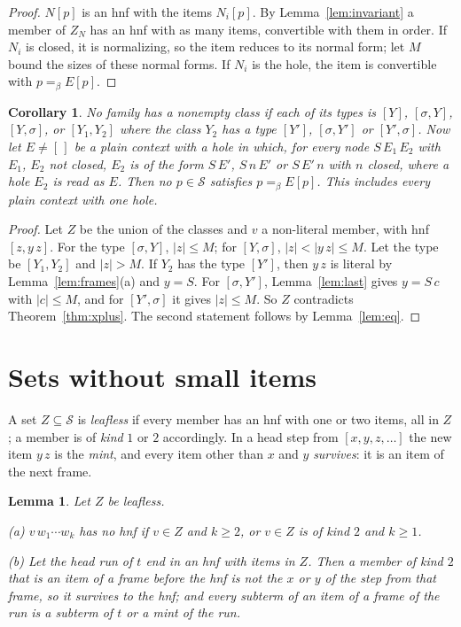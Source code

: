 \documentclass[11pt]{amsart}
\newtheorem{lemma}[theorem]{Lemma}
\newtheorem{corollary}[theorem]{Corollary}
\newcommand{\Ter}{\mathcal S}
\newcommand{\conv}{=_\beta}
\newcommand{\sz}[1]{\lvert#1\rvert}
\newcommand{\fr}[1]{[#1]}
\begin{document}
\begin{proof}
$N[p]$ is an hnf with the items $N_i[p]$. By Lemma~\ref{lem:invariant} a member of $Z_N$ has an hnf
with as many items, convertible with them in order. If $N_i$ is closed, it is normalizing, so the
item reduces to its normal form; let $M$ bound the sizes of these normal forms. If $N_i$ is the
hole, the item is convertible with $p\conv E[p]$.
\end{proof}

\begin{corollary}\label{cor:x1}
No family has a nonempty class if each of its types is $\fr{Y}$, $\fr{\sigma,Y}$, $\fr{Y,\sigma}$, or
$\fr{Y_1,Y_2}$ where the class $Y_2$ has a type $\fr{Y'}$, $\fr{\sigma,Y'}$ or $\fr{Y',\sigma}$.
Now let $E\ne[\,]$ be a plain context with a hole in which, for every node $S\,E_1\,E_2$ with
$E_1$, $E_2$ not closed, $E_2$ is of the form $S\,E'$, $S\,n\,E'$ or $S\,E'\,n$ with $n$ closed,
where a hole $E_2$ is read as $E$. Then no $p\in\Ter$ satisfies $p\conv E[p]$. This includes every
plain context with one hole.
\end{corollary}

\begin{proof}
Let $Z$ be the union of the classes and $v$ a non-literal member, with hnf $\fr{z,y\,z}$. For the
type $\fr{\sigma,Y}$, $\sz z\le M$; for $\fr{Y,\sigma}$, $\sz z<\sz{y\,z}\le M$. Let the type be
$\fr{Y_1,Y_2}$ and $\sz z>M$. If $Y_2$ has the type $\fr{Y'}$, then $y\,z$ is literal by
Lemma~\ref{lem:frames}(a) and $y=S$. For $\fr{\sigma,Y'}$, Lemma~\ref{lem:last} gives $y=S\,c$
with $\sz c\le M$, and for $\fr{Y',\sigma}$ it gives $\sz z\le M$. So $Z$ contradicts
Theorem~\ref{thm:xplus}. The second statement follows by Lemma~\ref{lem:eq}.
\end{proof}

\section{Sets without small items}\label{sec:leafless}

A set $Z\subseteq\Ter$ is \emph{leafless} if every member has an hnf with one or two items, all
in $Z$; a member is of \emph{kind} $1$ or $2$ accordingly. In a head step from $\fr{x,y,z,\dots}$
the new item $y\,z$ is the \emph{mint}, and every item other than $x$ and $y$ \emph{survives}: it
is an item of the next frame.

\begin{lemma}\label{lem:leaf}
Let $Z$ be leafless.

\textup{(a)} $v\,w_1\cdots w_k$ has no hnf if $v\in Z$ and $k\ge2$, or $v\in Z$ is of kind $2$ and
  $k\ge1$.

\textup{(b)} Let the head run of $t$ end in an hnf with items in $Z$. Then a member of kind $2$ that
  is an item of a frame before the hnf is not the $x$ or $y$ of the step from that frame, so it
  survives to the hnf; and every subterm of an item of a frame of the run is a subterm of $t$ or a
  mint of the run.
\end{lemma}
\end{document}
